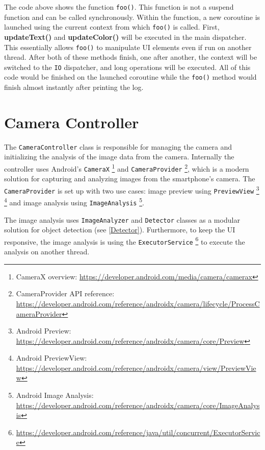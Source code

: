 The code above shows the function \texttt{foo()}. This function is not a suspend function and can be called synchronously. Within the function, a new coroutine is launched using the current context from which \texttt{foo()} is called. First, \textbf{updateText()} and \textbf{updateColor()} will be executed in the main dispatcher. This essentially allows \texttt{foo()} to manipulate UI elements even if run on another thread. After both of these methods finish, one after another, the context will be switched to the \texttt{IO} dispatcher, and long operations will be executed. All of this code would be finished on the launched coroutine while the \texttt{foo()} method would finish almost instantly after printing the log.




 
\section{Camera Controller}
\label{CameraController}

The \texttt{CameraController} class is responsible for managing the camera and initializing the analysis of the image data from the camera. Internally the controller uses Android's \texttt{CameraX} \footnote{CameraX overview: \url{https://developer.android.com/media/camera/camerax}} and \texttt{CameraProvider} \footnote{CameraProvider API reference: \url{https://developer.android.com/reference/androidx/camera/lifecycle/ProcessCameraProvider}}, which is a modern solution for capturing and analyzing images from the smartphone's camera. 
The \texttt{CameraProvider} is set up with two use cases: image preview using \texttt{PreviewView} \footnote{Android Preview: \url{https://developer.android.com/reference/androidx/camera/core/Preview}} \footnote{Android PreviewView: \url{https://developer.android.com/reference/androidx/camera/view/PreviewView}} and image analysis using \texttt{ImageAnalysis} \footnote{Android Image Analysis: \url{https://developer.android.com/reference/androidx/camera/core/ImageAnalysis}}.

The image analysis uses \texttt{ImageAnalyzer} and \texttt{Detector} classes as a modular solution for object detection (see \ref{Detector}). Furthermore, to keep the UI responsive, the image analysis is using the \texttt{ExecutorService} \footnote{\url{https://developer.android.com/reference/java/util/concurrent/ExecutorService}} to execute the analysis on another thread. 

